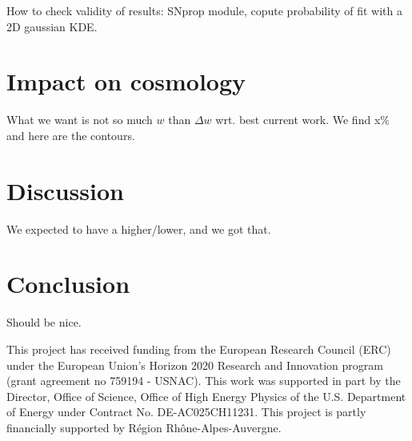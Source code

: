 \documentclass[]{aa}
\begin{document}
How to check validity of results: SNprop module, copute probability of fit with
a 2D gaussian KDE.

\section{Impact on cosmology}
What we want is not so much $w$ than $\Delta w$ wrt. best current work. We find
x\% and here are the contours.

\section{Discussion}\label{sec:discussion}
We expected to have a higher/lower, and we got that.

\section{Conclusion}\label{sec:ccl}

Should be nice.

\begin{acknowledgements}
    This project has received funding from the European Research Council (ERC)
    under the European Union's Horizon 2020 Research and Innovation program
    (grant agreement no 759194 - USNAC).
    This work was supported in part by the Director, Office of Science, Office
    of High Energy Physics of the U.S. Department of Energy under Contract No.
    DE-AC025CH11231.
    This project is partly financially supported by Région Rhône-Alpes-Auvergne.
\end{acknowledgements}
\end{document}
